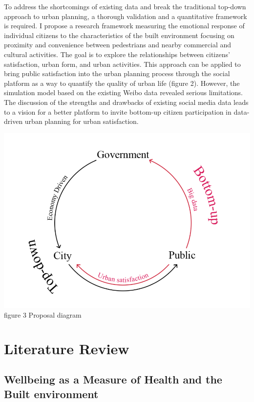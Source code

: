 \documentclass[
]{article}
\begin{document}
To address the shortcomings of existing data and break the traditional
top-down approach to urban planning, a thorough validation and a
quantitative framework is required. I propose a research framework
measuring the emotional response of individual citizens to the
characteristics of the built environment focusing on proximity and
convenience between pedestrians and nearby commercial and cultural
activities. The goal is to explore the relationships between citizens'
satisfaction, urban form, and urban activities. This approach can be
applied to bring public satisfaction into the urban planning process
through the social platform as a way to quantify the quality of urban
life (figure 2). However, the simulation model based on the existing
Weibo data revealed serious limitations. The discussion of the strengths
and drawbacks of existing social media data leads to a vision for a
better platform to invite bottom-up citizen participation in data-driven
urban planning for urban satisfaction.

\href{https://WTHSYZW.github.io/Thesis_2022/maps/proposaldiagram.png}{\includegraphics{maps/proposaldiagram.png}}
figure 3 Proposal diagram

\hypertarget{literature-review}{%
\section{Literature Review}\label{literature-review}}

\hypertarget{wellbeing-as-a-measure-of-health-and-the-built-environment}{%
\subsection{Wellbeing as a Measure of Health and the Built
environment}\label{wellbeing-as-a-measure-of-health-and-the-built-environment}}
\end{document}

